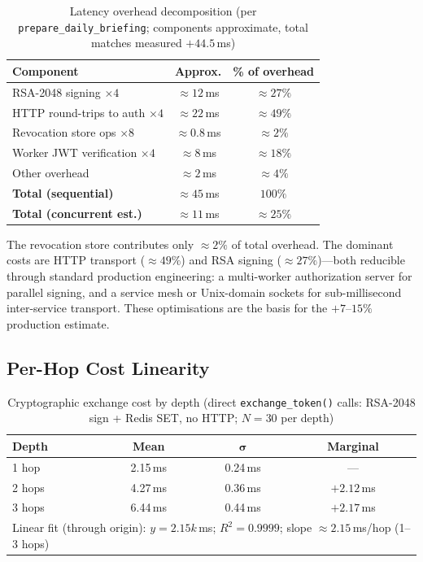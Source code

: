 \documentclass[journal]{IEEEtran}
\begin{document}
\begin{table}[h]
\caption{Latency overhead decomposition (per \texttt{prepare\_daily\_briefing};
         components approximate, total matches measured $+44.5$\,ms)}
\label{tab:decomp}
\centering
\footnotesize
\begin{tabular}{lcc}
\toprule
\textbf{Component} & \textbf{Approx.} & \textbf{\% of overhead} \\
\midrule
RSA-2048 signing $\times 4$         & $\approx 12$\,ms  & $\approx 27\%$ \\
HTTP round-trips to auth $\times 4$ & $\approx 22$\,ms  & $\approx 49\%$ \\
Revocation store ops $\times 8$     & $\approx 0.8$\,ms & $\approx 2\%$  \\
Worker JWT verification $\times 4$  & $\approx 8$\,ms   & $\approx 18\%$ \\
Other overhead                      & $\approx 2$\,ms   & $\approx 4\%$  \\
\midrule
\textbf{Total (sequential)}         & $\approx 45$\,ms  & $100\%$ \\
\textbf{Total (concurrent est.)}    & $\approx 11$\,ms  & $\approx 25\%$ \\
\bottomrule
\end{tabular}
\end{table}

The revocation store contributes only $\approx 2\%$ of total overhead. The
dominant costs are HTTP transport ($\approx 49\%$) and RSA signing ($\approx
27\%$)---both reducible through standard production engineering: a multi-worker
authorization server for parallel signing, and a service mesh or Unix-domain
sockets for sub-millisecond inter-service transport. These optimisations are
the basis for the $+7$--$15\%$ production estimate.

\subsection{Per-Hop Cost Linearity}

\begin{table}[h]
\caption{Cryptographic exchange cost by depth (direct \texttt{exchange\_token()}
         calls: RSA-2048 sign + Redis SET, no HTTP; $N=30$ per depth)}
\label{tab:hopcosts}
\centering
\footnotesize
\begin{tabular}{lccc}
\toprule
\textbf{Depth} & \textbf{Mean} & $\boldsymbol\sigma$ & \textbf{Marginal} \\
\midrule
1 hop  & 2.15\,ms & 0.24\,ms & --- \\
2 hops & 4.27\,ms & 0.36\,ms & $+2.12$\,ms \\
3 hops & 6.44\,ms & 0.44\,ms & $+2.17$\,ms \\
\midrule
\multicolumn{4}{l}{\scriptsize
  Linear fit (through origin): $y = 2.15k$\,ms;\; $R^2 = 0.9999$;\;
  slope $\approx 2.15$\,ms/hop (1--3 hops)}
\end{tabular}
\end{table}
\end{document}
